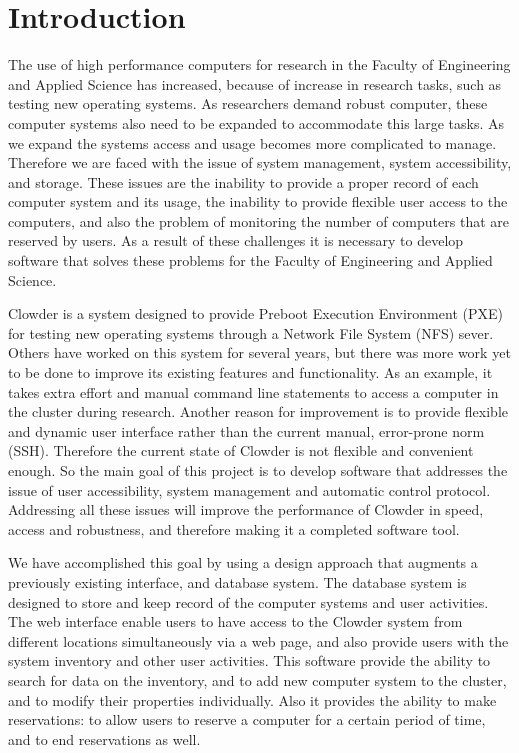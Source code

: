 \chapter{Introduction}
\label{chap:intro}

The use of high performance computers for  research in the Faculty of Engineering  and Applied Science has increased, because of increase in research tasks, such as testing new operating systems. As researchers demand robust computer, these computer systems also need to be expanded to accommodate this large tasks. As we expand the systems access and usage  becomes more complicated to manage. Therefore we are faced with the issue of system management, system accessibility, and storage. These issues are the inability to provide  a proper record of each computer system and its usage, the inability to provide flexible user access to the computers, and also the problem of monitoring the number of computers that are reserved by users. As a result of these challenges it is necessary to develop software that solves these problems for the Faculty of Engineering and Applied Science. 


Clowder is a system designed to provide Preboot Execution Environment (PXE) for testing new operating systems through a Network File System (NFS) sever. Others have worked on this system for several years, but there was more work yet to be done to improve its existing features and functionality. As an example, it takes extra effort and manual command line statements to access  a computer in the cluster during research. Another reason for improvement is to provide flexible and dynamic user interface rather than the current manual, error-prone norm (SSH). Therefore the current state of Clowder is not flexible and convenient enough. So the main goal of this project is to develop software that addresses the issue of user accessibility, system management and automatic control protocol. Addressing all these issues will improve the performance of Clowder in speed, access and robustness, and therefore making it a completed software tool. 
	
	
We have accomplished this goal by using a design approach that augments a previously existing interface, and database system. The database system is designed to store and keep record of the computer systems and user activities. The web interface enable users to have access to the Clowder system from different locations simultaneously via a web page, and also provide users with the system inventory and other user activities. This  software provide the ability to search for data on the inventory, and to add new computer system to the cluster, and to modify their properties individually. Also it provides the ability to make reservations: to allow users to reserve a computer for a certain period of time, and to end reservations as well.    
	


